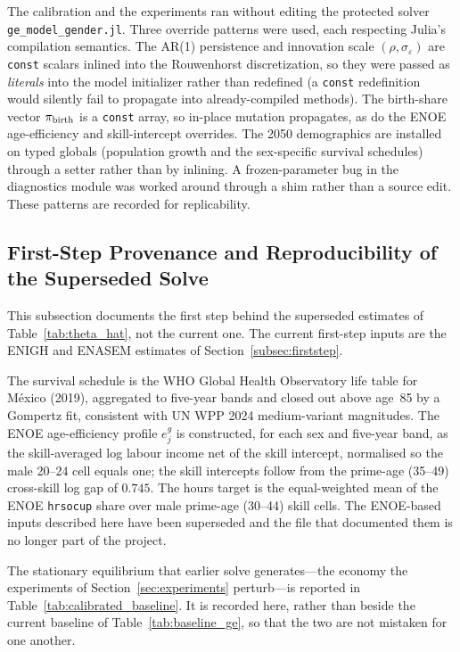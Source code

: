 \documentclass[12pt,a4paper]{article}
\begin{document}
\begin{appendices}
The calibration and the experiments ran without editing the protected solver \texttt{ge\_model\_gender.jl}. Three override patterns were used, each respecting Julia's compilation semantics. The AR(1) persistence and innovation scale $(\rho,\sigma_\varepsilon)$ are \texttt{const} scalars inlined into the Rouwenhorst discretization, so they were passed as \emph{literals} into the model initializer rather than redefined (a \texttt{const} redefinition would silently fail to propagate into already-compiled methods). The birth-share vector $\pi_{\rm birth}$ is a \texttt{const} array, so in-place mutation propagates, as do the ENOE age-efficiency and skill-intercept overrides. The 2050 demographics are installed on typed globals (population growth and the sex-specific survival schedules) through a setter rather than by inlining. A frozen-parameter bug in the diagnostics module was worked around through a shim rather than a source edit. These patterns are recorded for replicability.

\subsection{First-Step Provenance and Reproducibility of the Superseded Solve}
\label{app:provenance}

This subsection documents the first step behind the superseded estimates of Table~\ref{tab:theta_hat}, not the current one. The current first-step inputs are the ENIGH and ENASEM estimates of Section~\ref{subsec:firststep}.

The survival schedule is the WHO Global Health Observatory life table for M\'exico (2019), aggregated to five-year bands and closed out above age~85 by a Gompertz fit, consistent with UN WPP 2024 medium-variant magnitudes. The ENOE age-efficiency profile $e^g_j$ is constructed, for each sex and five-year band, as the skill-averaged log labour income net of the skill intercept, normalised so the male 20--24 cell equals one; the skill intercepts follow from the prime-age (35--49) cross-skill log gap of $0.745$. The hours target is the equal-weighted mean of the ENOE \texttt{hrsocup} share over male prime-age (30--44) skill cells. The ENOE-based inputs described here have been superseded and the file that documented them is no longer part of the project.

The stationary equilibrium that earlier solve generates---the economy the experiments of Section~\ref{sec:experiments} perturb---is reported in Table~\ref{tab:calibrated_baseline}. It is recorded here, rather than beside the current baseline of Table~\ref{tab:baseline_ge}, so that the two are not mistaken for one another.


\end{appendices}
\end{document}
